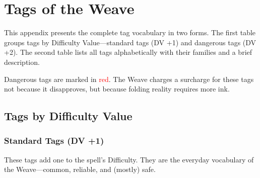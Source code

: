 \chapter{Tags of the Weave}

This appendix presents the complete tag vocabulary in two forms. The first table groups tags by Difficulty Value---standard tags (DV +1) and dangerous tags (DV +2). The second table lists all tags alphabetically with their families and a brief description.

Dangerous tags are marked in \textcolor{red}{red}. The Weave charges a surcharge for these tags not because it disapproves, but because folding reality requires more ink.

\section{Tags by Difficulty Value}

\subsection{Standard Tags (DV +1)}

These tags add one to the spell's Difficulty. They are the everyday vocabulary of the Weave---common, reliable, and (mostly) safe.

